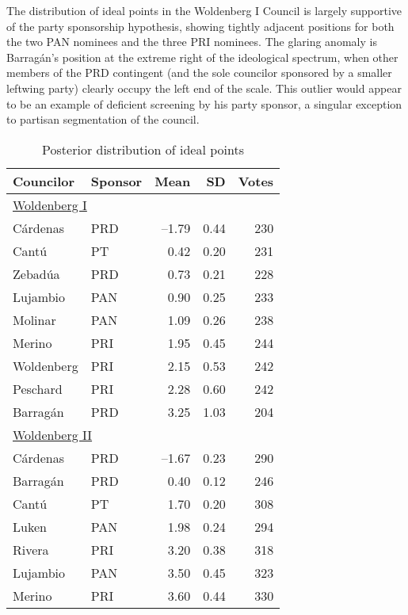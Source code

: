 \documentclass[12 pt]{article}
\begin{document}
The distribution of ideal points in the Woldenberg I Council is largely supportive of the party sponsorship hypothesis, showing tightly adjacent positions for both the two PAN nominees and the three PRI nominees.  The glaring anomaly is Barrag\'an's position at the extreme right of the ideological spectrum, when other members of the PRD contingent (and the sole councilor sponsored by a smaller leftwing party) clearly occupy the left end of the scale.  This outlier would appear to be an example of deficient screening by his party sponsor, a singular exception to partisan segmentation of the council.

\begin{table}
\caption{Posterior distribution of ideal points}\label{T:idealpoints}
\begin{center}
\begin{tabular}{llrrr}
\hline
 Councilor   &  Sponsor  &    Mean    & SD & Votes\\ \hline
\multicolumn{5}{l}{\underline{Woldenberg I}}   \\ [1.5ex]
C\'ardenas        & PRD &--1.79  &   0.44 & 230\\
Cant\'u           & PT  &  0.42  &   0.20 & 231\\
Zebad\'ua         & PRD &  0.73  &   0.21 & 228\\
Lujambio          & PAN &  0.90  &   0.25 & 233\\
Molinar           & PAN &  1.09  &   0.26 & 238\\
Merino            & PRI &  1.95  &   0.45 & 244\\
Woldenberg        & PRI &  2.15  &   0.53 & 242\\
Peschard          & PRI &  2.28  &   0.60 & 242\\
Barrag\'an        & PRD &  3.25  &   1.03 & 204\\ [1ex]
\multicolumn{5}{l}{\underline{Woldenberg II}}  \\ [1.5ex]
C\'ardenas        & PRD &--1.67  &   0.23 & 290\\
Barrag\'an        & PRD &  0.40  &   0.12 & 246\\
Cant\'u           & PT  &  1.70  &   0.20 & 308\\
Luken             & PAN &  1.98  &   0.24 & 294\\
Rivera            & PRI &  3.20  &   0.38 & 318\\
Lujambio          & PAN &  3.50  &   0.45 & 323\\
Merino            & PRI &  3.60  &   0.44 & 330\\

\end{tabular}
\end{center}
\end{table}
\end{document}
